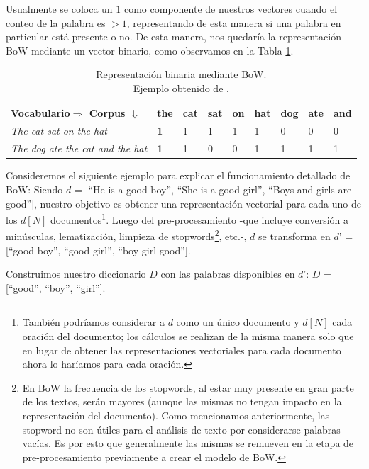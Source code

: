 \documentclass[12pt,a4paper]{article}
\begin{document}
\begin{sloppypar}
Usualmente se coloca un $1$ como componente de nuestros vectores cuando el conteo de la palabra es $>1$, representando de esta manera si una palabra en particular está presente o no. De esta manera, nos quedaría la representación BoW mediante un vector binario, como observamos en la Tabla \ref{table:bow_2}.

\begin{table}[h!]
\centering
\begin{tabular}{|p{4cm}||p{1cm}|p{1cm}|p{1cm}|p{1cm}|p{1cm}|p{1cm}|p{1cm}|p{1cm}|}
\hline
\textbf{Vocabulario$\Rightarrow$ Corpus $\Downarrow$} & the & cat & sat & on & hat & dog & ate & and \\ [1ex] 
\hline
\textit{The cat sat on the hat} & \textbf{1} & 1 & 1 & 1 & 1 & 0 & 0 & 0 \\ 
\hline
\textit{The dog ate the cat and the hat} & \textbf{1} & 1 & 0 & 0 & 1 & 1 & 1 & 1 \\ 
\hline
\end{tabular}
\caption{Representación binaria mediante BoW.\\ Ejemplo obtenido de \cite{NLP_8}.} 
\label{table:bow_2}
\end{table}

Consideremos el siguiente ejemplo para explicar el funcionamiento detallado de BoW\cite{NLP_2}: 
Siendo $d$ = [``He is a good boy'', ``She is a good girl'', ``Boys and girls are good''], nuestro objetivo es obtener una representación vectorial para cada uno de los $d[N]$ documentos\footnote{También podríamos considerar a $d$ como un único documento y $d[N]$ cada oración del documento; los cálculos se realizan de la misma manera solo que en lugar de obtener las representaciones vectoriales para cada documento ahora lo haríamos para cada oración.}.
Luego del pre-procesamiento -que incluye conversión a minúsculas, lematización, limpieza de stopwords\footnote{En BoW la frecuencia de los stopwords, al estar muy presente en gran parte de los textos, serán mayores (aunque las mismas no tengan impacto en la representación del documento). Como mencionamos anteriormente, las stopword no son útiles para el análisis de texto por considerarse palabras vacías. Es por esto que generalmente las mismas se remueven en la etapa de pre-procesamiento previamente a crear el modelo de BoW.}, etc.-, $d$ se transforma en $d’$ = [``good boy'', ``good girl'', ``boy girl good'']. 

Construimos nuestro diccionario $D$ con las palabras disponibles en $d’$: \hspace{3cm}
$D$ = [``good'', ``boy'', ``girl''].


\end{sloppypar}
\end{document}

